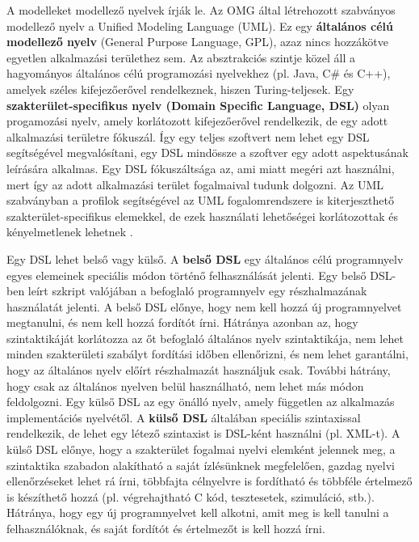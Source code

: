 \documentclass[12pt, a4paper]{report}
\newcommand{\bb}[1]{\textbf{#1}}
\begin{document}
A modelleket modellező nyelvek írják le. Az OMG által létrehozott szabványos modellező nyelv a Unified Modeling Language (UML). Ez egy \bb{általános célú modellező nyelv} (General Purpose Language, GPL), azaz nincs hozzákötve egyetlen alkalmazási területhez sem. Az absztrakciós szintje közel áll a hagyományos általános célú programozási nyelvekhez (pl. Java, C\# és C++), amelyek széles kifejezőerővel rendelkeznek, hiszen Turing-teljesek. Egy \bb{szakterület-specifikus nyelv (Domain Specific Language, DSL)} \cite{Voe13} \cite{Fow10} olyan progamozási nyelv, amely korlátozott kifejezőerővel rendelkezik, de egy adott alkalmazási területre fókuszál. Így egy teljes szoftvert nem lehet egy DSL segítségével megvalósítani, egy DSL mindössze a szoftver egy adott aspektusának leírására alkalmas. Egy DSL fókuszáltsága az, ami miatt megéri azt használni, mert így az adott alkalmazási terület fogalmaival tudunk dolgozni. Az UML szabványban a profilok segítségével az UML fogalomrendszere is kiterjeszthető szakterület-specifikus elemekkel, de ezek használati lehetőségei korlátozottak és kényelmetlenek lehetnek \cite{Voe13}.

Egy DSL lehet belső vagy külső. A \bb{belső DSL} egy általános célú programnyelv egyes elemeinek speciális módon történő felhasználását jelenti. Egy belső DSL-ben leírt szkript valójában a befoglaló programnyelv egy részhalmazának használatát jelenti. A belső DSL előnye, hogy nem kell hozzá új programnyelvet megtanulni, és nem kell hozzá fordítót írni. Hátránya azonban az, hogy szintaktikáját korlátozza az őt befoglaló általános nyelv szintaktikája, nem lehet minden szakterületi szabályt fordítási időben ellenőrizni, és nem lehet garantálni, hogy az általános nyelv előírt részhalmazát használjuk csak. További hátrány, hogy csak az általános nyelven belül használható, nem lehet más módon feldolgozni. Egy külső DSL az egy önálló nyelv, amely független az alkalmazás implementációs nyelvétől. A \bb{külső DSL} általában speciális szintaxissal rendelkezik, de lehet egy létező szintaxist is DSL-ként használni (pl. XML-t). A külső DSL előnye, hogy a szakterület fogalmai nyelvi elemként jelennek meg, a szintaktika szabadon alakítható a saját ízlésünknek megfelelően, gazdag nyelvi ellenőrzéseket lehet rá írni, többfajta célnyelvre is fordítható és többféle értelmező is készíthető hozzá (pl. végrehajtható C kód, tesztesetek, szimuláció, stb.). Hátránya, hogy egy új programnyelvet kell alkotni, amit meg is kell tanulni a felhasználóknak, és saját fordítót és értelmezőt is kell hozzá írni.
\end{document}
